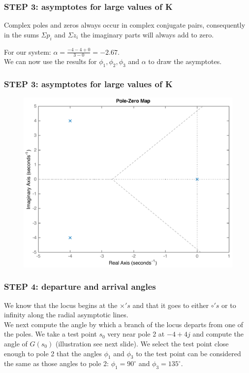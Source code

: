 \begin{frame}
\frametitle{STEP 3: asymptotes for large values of K}
	Complex poles and zeros always occur in complex conjugate pairs, consequently in the sums $\Sigma p_i$ and $\Sigma z_i$ the imaginary parts will always add to zero.\\
	\vspace{0.5em}
	\begin{exampleblock}{}
	For our system: $\alpha = \frac{-4-4+0}{3-0} = -2.67.$\\
	\vspace{1em}
	We can now use the results for $\phi_1, \phi_2, \phi_3$ and $\alpha$ to draw the asymptotes. 
	\end{exampleblock}
\end{frame}

\begin{frame}
\frametitle{STEP 3: asymptotes for large values of K}
	\begin{exampleblock}{}
		\begin{figure}
			\centering
			\includegraphics[width=0.7\linewidth]{how_to_draw_ex3}
		\end{figure}
	\end{exampleblock}
\end{frame}

\begin{frame}
\frametitle{STEP 4: departure and arrival angles}
	We know that the locus begins at the $\times's$ and that it goes to either $\circ's$ or to infinity along the radial asymptotic lines.\\
	\vspace{1em}
	We next compute the angle by which a branch of the locus departs from one of the poles. We take a test point $s_0$ very near pole 2 at $-4+4j$ and compute the angle of $G(s_0)$ (illustration see next slide). We select the test point close enough to pole 2 that the angles $\phi_1$ and $\phi_3$ to the test point can be considered the same as those angles to pole 2: $\phi_1 = 90^{\circ}$ and $\phi_3 = 135^{\circ}$. 
\end{frame}


